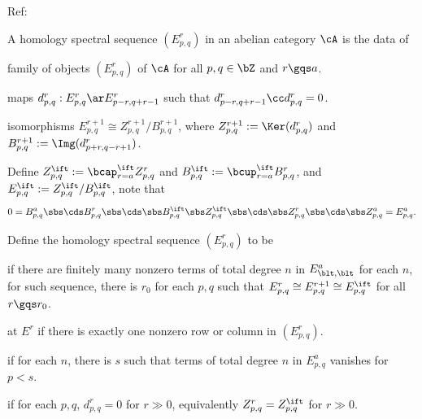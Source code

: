 \documentclass[a4paper, twoside]{article}
\begin{document}
\confighead{}{}{}

Ref: \cite{Weibel1994}


\begin{dfn}[5.2.1, 5.2.8]
    A homology spectral sequence $(E_{p,q}^{r}) $ in an abelian category $\cA$ is the data of
    \begin{itm}
        \item family of objects $(E_{p,q}^{r})$ of $\cA$ for all $p,q\in\bZ$ and $r\gqs a$.
        \item maps $d_{p,q}^{r}:E_{p,q}^{r}\ar E_{p-r,q+r-1}^{r}$ such that $d_{p-r,q+r-1}^{r}\cc d_{p,q}^{r}=0$.
        \item isomorphisms $E_{p,q}^{r+1}\cong Z_{p,q}^{r+1}/B_{p,q}^{r+1}$, where $Z_{p,q}^{r+1}:=\Ker(d_{p,q}^{r})$ and $B_{p,q}^{r+1}:=\Img(d_{p+r,q-r+1}^{r})$.
    \end{itm}
    Define $Z_{p,q}^{\ift}:=\bcap_{r=a}^{\ift}Z_{p,q}^{r}$ and $B_{p,q}^{\ift}:=\bcup_{r=a}^{\ift}B_{p,q}^{r}$, and $E_{p,q}^{\ift}:=Z_{p,q}^{\ift}/B_{p,q}^{\ift}$, note that
    \[
        0=B_{p,q}^{a}\sbs\cds B_{p,q}^{r}\sbs\cds\sbs B_{p,q}^{\ift}\sbs Z_{p,q}^{\ift}\sbs\cds\sbs Z_{p,q}^{r}\sbs\cds\sbs Z_{p,q}^{a}=E_{p,q}^{a}.
    \]
\end{dfn}

\begin{dfn}[5.2.5, 5.2.7, 5.2.9, 5.2.10]
    Define the homology spectral sequence $(E_{p,q}^{r})$ to be
    \begin{itm}
        \item {} if there are finitely many nonzero terms of total degree $n$ in $E_{\blt,\blt}^{a}$ for each $n$, for such sequence, there is $r_{0}$ for each $p,q$ such that $E_{p,q}^{r}\cong E_{p,q}^{r+1}\cong E_{p,q}^{\ift}$ for all $r\gqs r_{0}$.
        \item {} at $E^{r}$ if there is exactly one nonzero row or column in $(E_{p,q}^{r})$.
        \item {} if for each $n$, there is $s$ such that terms of total degree $n$ in $E_{p,q}^{a}$ vanishes for $p<s$.
        \item {} if for each $p,q$, $d_{p,q}^{r}=0$ for $r\gg 0$, equivalently $Z_{p,q}^{r}=Z_{p,q}^{\ift}$ for $r\gg 0$.
    \end{itm}
\end{dfn}
\end{document}
